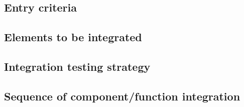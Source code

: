 \subsection{Entry criteria}

\subsection{Elements to be integrated}

\subsection{Integration testing strategy}

\subsection{Sequence of component/function integration}
